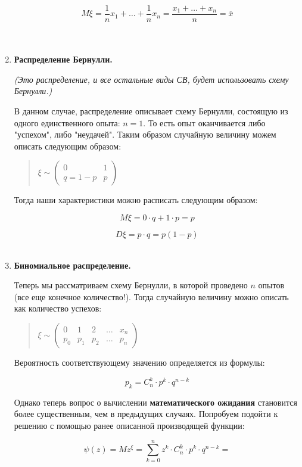 \documentclass{article}
\begin{document}
\begin{enumerate}
$$M\xi = \frac{1}{n} x_1 + \ldots + \frac{1}{n}x_n = \frac{x_1 + \ldots + x_n}{n} = \overline{x}$$
\\
\\

\item \textbf{Распределение Бернулли.}

\textit{(Это распределение, и все остальные виды СВ, будет использовать схему Бернулли.)}

В данном случае, распределение описывает схему Бернулли, состоящую из одного единственного опыта: $n = 1$. То есть опыт оканчивается либо "успехом", либо "неудачей". Таким образом случайную величину можем описать следующим образом:

\begin{quote}
$\xi \sim
\begin{pmatrix}
0 & 1\\
q = 1 - p & p
\end{pmatrix}$
\end{quote}
 
Тогда наши характеристики можно расписать следующим образом:

$$\boxed{M\xi} = 0 \cdot q + 1 \cdot p = \boxed{ p}$$

$$\boxed{D\xi} = p \cdot q = \boxed{ p(1 - p)}$$
\\

\item \textbf{Биномиальное распределение.}

Теперь мы рассматриваем схему Бернулли, в которой проведено $n$ опытов (все еще конечное количество!). Тогда случайную величину можно описать как количество успехов:

\begin{quote}
$\xi \sim
\begin{pmatrix}
0 & 1 & 2 & \ldots & x_n\\
p_0 & p_1 & p_2 & \ldots & p_n
\end{pmatrix}$
\end{quote}

Вероятность соответствующему значению определяется из формулы:

$$p_k = C_n^k \cdot p^k \cdot q^{n - k}$$

Однако теперь вопрос о вычислении \textbf{математического ожидания} становится более существенным,
чем в предыдущих случаях. Попробуем подойти к решению с помощью ранее описанной производящей функции:

$$\psi(z) = Mz^\xi = \sum\limits_{k = 0}^n z^k \cdot C_n^k \cdot p^k \cdot q^{n - k} = $$


\end{enumerate}
\end{document}
